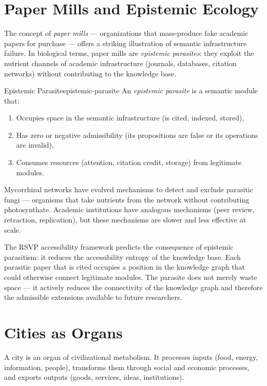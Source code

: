 \section{Paper Mills and Epistemic Ecology}

The concept of \emph{paper mills} — organizations that mass-produce
fake academic papers for purchase — offers a striking illustration of
semantic infrastructure failure. In biological terms, paper mills are
\emph{epistemic parasites}: they exploit the nutrient channels of
academic infrastructure (journals, databases, citation networks)
without contributing to the knowledge base.

\begin{definition}{Epistemic Parasite}{epistemic-parasite}
  An \emph{epistemic parasite} is a semantic module that:
  \begin{enumerate}
    \item Occupies space in the semantic infrastructure (is cited,
          indexed, stored),
    \item Has zero or negative admissibility (its propositions are
          false or its operations are invalid),
    \item Consumes resources (attention, citation credit, storage)
          from legitimate modules.
  \end{enumerate}
\end{definition}

Mycorrhizal networks have evolved mechanisms to detect and exclude
parasitic fungi — organisms that take nutrients from the network
without contributing photosynthate. Academic institutions have analogous
mechanisms (peer review, retraction, replication), but these mechanisms
are slower and less effective at scale.

The RSVP accessibility framework predicts the consequence of epistemic
parasitism: it reduces the accessibility entropy of the knowledge base.
Each parasitic paper that is cited occupies a position in the knowledge
graph that could otherwise connect legitimate modules. The parasite does
not merely waste space — it actively reduces the connectivity of the
knowledge graph and therefore the admissible extensions available to
future researchers.

\section{Cities as Organs}

A city is an organ of civilizational metabolism. It processes inputs
(food, energy, information, people), transforms them through social and
economic processes, and exports outputs (goods, services, ideas, institutions).

